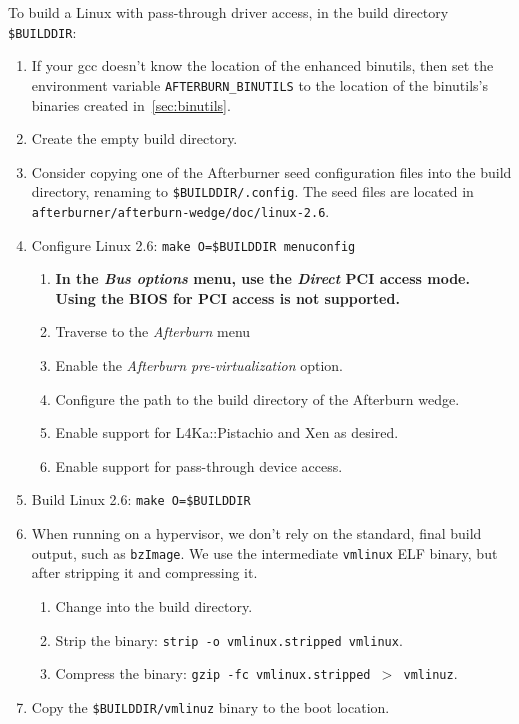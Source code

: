 \documentclass[twoside,a4paper]{report}
\newcommand{\code}[1]{{\tt #1}}
\newcommand{\cmd}[1]{\code{#1}}
\begin{document}
To build a Linux with pass-through driver access, in the build
directory \code{\$BUILDDIR}:
\begin{enumerate}
\item If your gcc doesn't know the location of the enhanced binutils,
then set the environment variable \code{AFTERBURN\_BINUTILS} to the
location of the binutils's binaries created in~\ref{sec:binutils}.
\item Create the empty build directory.
\item Consider copying one of the Afterburner seed 
configuration files into the build directory, renaming to
\code{\$BUILDDIR/.config}.  The seed files are
located in \code{afterburner/afterburn-wedge/doc/linux-2.6}.
\item Configure Linux 2.6: \cmd{make O=\$BUILDDIR menuconfig}
  \begin{enumerate}
  \item \textbf{In the \emph{Bus options} menu, use the \emph{Direct}
  PCI access mode.  Using the BIOS for PCI access is not supported.}
  \item Traverse to the \emph{Afterburn} menu
  \item Enable the \emph{Afterburn pre-virtualization} option.
  \item Configure the path to the build directory of the Afterburn
  wedge.
  \item Enable support for L4Ka::Pistachio and Xen as desired.
  \item Enable support for pass-through device access.
  \end{enumerate}
\item Build Linux 2.6: \cmd{make O=\$BUILDDIR}
\item When running on a hypervisor, we don't rely on the standard,
final build output, such as \code{bzImage}.  We use the intermediate
\code{vmlinux} ELF binary, but after stripping it and compressing it.  
  \begin{enumerate}
  \item Change into the build directory.
  \item Strip the binary: \cmd{strip -o vmlinux.stripped vmlinux}.
  \item Compress the binary: \cmd{gzip -fc vmlinux.stripped $>$ vmlinuz}.
  \end{enumerate}
\item Copy the \code{\$BUILDDIR/vmlinuz} binary to the boot location.
\end{enumerate}

%
%
\end{document}
